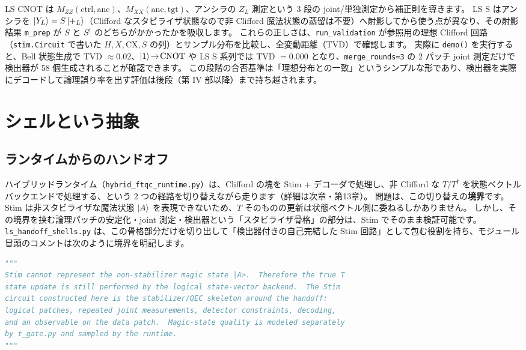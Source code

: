 LS CNOT は $M_{ZZ}(\mathrm{ctrl},\mathrm{anc})$、$M_{XX}(\mathrm{anc},\mathrm{tgt})$、アンシラの $Z_L$ 測定という 3 段の joint/単独測定から補正則を導きます。
LS S はアンシラを $\ket{Y_L}=S\ket{+_L}$（Clifford なスタビライザ状態なので非 Clifford 魔法状態の蒸留は不要）へ射影してから使う点が異なり、その射影結果 \texttt{m\_prep} が $S$ と $S^\dagger$ のどちらがかかったかを吸収します\cite{horsman2012lattice}。
これらの正しさは、\texttt{run\_validation} が参照用の理想 Clifford 回路（\texttt{stim.Circuit} で書いた $H,X,\mathrm{CX},S$ の列）とサンプル分布を比較し、全変動距離（TVD）で確認します。
実際に \texttt{demo()} を実行すると、Bell 状態生成で TVD $\approx 0.02$、$\ket{1}\!\to\!\text{CNOT}$ や LS S 系列では TVD $= 0.000$ となり、\texttt{merge\_rounds=3} の 2 パッチ joint 測定だけで検出器が 58 個生成されることが確認できます。
この段階の合否基準は「理想分布との一致」というシンプルな形であり、検出器を実際にデコードして論理誤り率を出す評価は後段（第 IV 部以降）まで持ち越されます。

\section{シェルという抽象}\label{sec:shell_abstract}

\subsection{ランタイムからのハンドオフ}\label{subsec:handoff}

ハイブリッドランタイム（\texttt{hybrid\_ftqc\_runtime.py}）は、Clifford の塊を Stim + デコーダで処理し、非 Clifford な $T/T^\dagger$ を状態ベクトルバックエンドで処理する、という 2 つの経路を切り替えながら走ります（詳細は次章・第13章）。
問題は、この切り替えの\textbf{境界}です。
Stim は非スタビライザな魔法状態 $\ket{A}$ を表現できないため、$T$ そのものの更新は状態ベクトル側に委ねるしかありません。
しかし、その境界を挟む論理パッチの安定化・joint 測定・検出器という「スタビライザ骨格」の部分は、Stim でそのまま検証可能です。
\texttt{ls\_handoff\_shells.py} は、この骨格部分だけを切り出して「検出器付きの自己完結した Stim 回路」として包む役割を持ち、モジュール冒頭のコメントは次のように境界を明記します。

\begin{lstlisting}[language=Python, caption={シェルの境界（src/stages/01\_mpp/src/ftqc/ls\_handoff\_shells.py）}]
"""
Stim cannot represent the non-stabilizer magic state |A>.  Therefore the true T
state update is still performed by the logical state-vector backend.  The Stim
circuit constructed here is the stabilizer/QEC skeleton around the handoff:
logical patches, repeated joint measurements, detector constraints, decoding,
and an observable on the data patch.  Magic-state quality is modeled separately
by t_gate.py and sampled by the runtime.
"""
\end{lstlisting}

